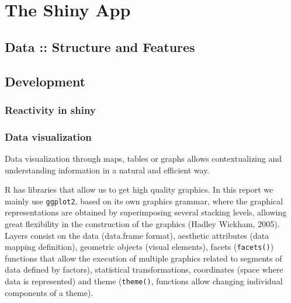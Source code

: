 \documentclass[11pt,a4paper]{report}
\begin{document}
\chapter{The Shiny App}

\section{Data :: Structure and Features}



\section{Development}


\subsection{Reactivity in shiny}







\subsection{Data visualization}
Data visualization through maps, tables or graphs allows contextualizing and understanding information in a natural and efficient way.


R has libraries that allow us to get high quality graphics. In this report we mainly use \verb!ggplot2!, based on its own graphics grammar,  where the graphical representations are obtained by superimposing several stacking levels, allowing great flexibility in the construction of the graphics (Hadley Wickham, 2005).  \cite{ggplot2}
\\
Layers consist on the data (data.frame format), aesthetic attributes (data mapping definition), geometric objects (visual elements), facets (\verb!facets()!) functions that allow the execution of multiple graphics related to segments of data defined by factors), statistical transformations, coordinates (space where data is represented) and theme (\verb!theme()!, functions allow changing individual components of a theme).
\end{document}
